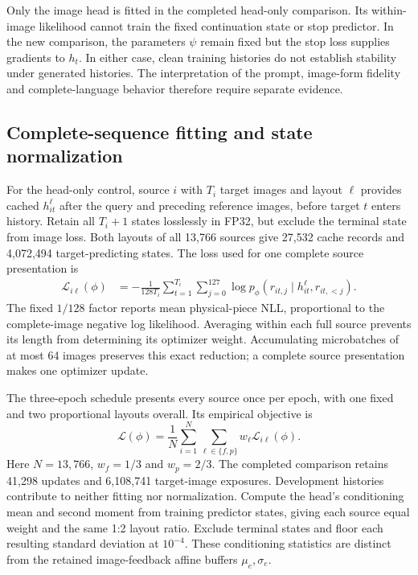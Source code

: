 \documentclass[12pt,a4paper]{article}
\providecommand{\DIFadd}[1]{{\protect\color{blue} \sf #1}} %
\begin{document}
\DIFadd{Only the image head is fitted in the completed head-only comparison. Its
within-image likelihood cannot train the fixed continuation state or stop
predictor. In the new comparison, the parameters $\psi$ remain fixed but the
stop loss supplies gradients to $h_t$. In either case, clean
training histories do not establish stability under generated histories.
The interpretation of the prompt, image-form fidelity and complete-language
behavior therefore require separate evidence.
}

\subsection*{\DIFadd{Complete-sequence fitting and state normalization}}
\DIFadd{For the head-only control, source $i$ with $T_i$ target images and layout $\ell$
provides cached
$h_{it}^{\ell}$ after the query and preceding reference images, before target
$t$ enters history. Retain all $T_i+1$ states losslessly in FP32, but exclude
the terminal state from image loss. Both layouts of all 13,766 sources give
27,532 cache records and 4,072,494 target-predicting states. The loss used for
one complete source presentation is
}\begin{equation}
 \begin{aligned}
 \mathcal L_{i\ell}(\phi)
   &=-\frac{1}{128T_i}\sum_{t=1}^{T_i}\sum_{j=0}^{127}
       \log p_\phi(r_{it,j}\mid h_{it}^{\ell},r_{it,<j}).
 \end{aligned}
 \label{eq:joint-glyph-sequence-loss}
\end{equation}
\DIFadd{The fixed $1/128$ factor reports mean physical-piece NLL, proportional to the
complete-image negative log likelihood. Averaging within each full source
prevents its length from determining its optimizer weight. Accumulating
microbatches of at most 64 images preserves this exact reduction; a complete
source presentation makes one optimizer update.
}

\DIFadd{The three-epoch schedule presents every source once per epoch, with one fixed
and two proportional layouts overall. Its empirical objective is
}\begin{equation}
 \mathcal L(\phi)=\frac{1}{N}\sum_{i=1}^{N}\sum_{\ell\in\{f,p\}}
       w_\ell\mathcal L_{i\ell}(\phi).
 \label{eq:joint-glyph-layout-loss}
\end{equation}
\DIFadd{Here $N=13{,}766$, $w_f=1/3$ and $w_p=2/3$.
The completed comparison retains 41,298 updates and 6,108,741 target-image
exposures. Development histories contribute to neither fitting nor
normalization. Compute the head's conditioning mean and second moment from
training predictor states, giving each source equal weight and the same 1:2
layout ratio. Exclude terminal states and floor each resulting standard
deviation at $10^{-4}$. These conditioning statistics are distinct from
the retained image-feedback affine buffers $\mu_e,\sigma_e$.
}
\end{document}
